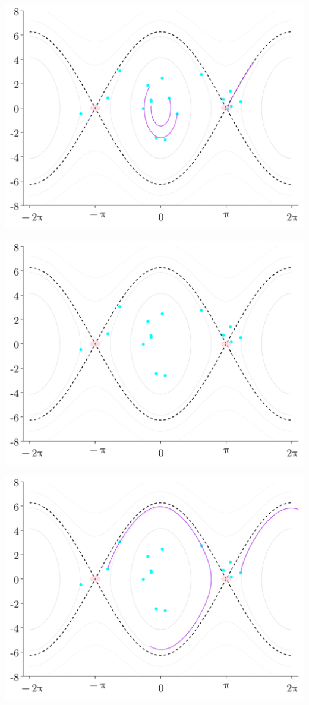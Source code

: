 \documentclass[
]{report}
\begin{document}
\includegraphics{contents/assets/neuralpbc/022.svg}

\includegraphics{contents/assets/neuralpbc/023.svg}

\includegraphics{contents/assets/neuralpbc/024.svg}
\end{document}
